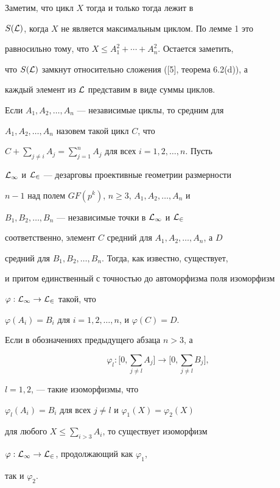 \begin{pf}


Заметим, что цикл $X$ тогда и только тогда лежит в


$S(\cal L)$, когда $X$ не является максимальным циклом. По лемме 1 это


равносильно тому, что $X \leq A_1^2 +\dotsb+A_n^2$. Остается заметить,


что $S(\cal L)$ замкнут относительно сложения ([5], теорема 6.2(d)), а


каждый элемент из $\cal L$ представим в виде суммы циклов.


\end{pf}





Если $A_1,A_2,\dotsc,A_n$ --- независимые циклы, то средним для


$A_1,A_2,\dotsc,A_n$ назовем такой цикл $C$, что


$C+\sum\limits_{j \ne i}A_j


=\sum \limits_{j=1}^n A_j$ для всех $i=1,2,\dotsc,n$. Пусть


$\cal L_1$ и $\cal L_2$ --- дезарговы проективные геометрии размерности


$n-1$ над полем $GF(p^k)$, $n \geq 3$, $A_1,A_2,\dotsc,A_n$ и


$B_1,B_2,\dotsc,B_n$ --- независимые точки в $\cal L_1$ и $\cal L_2$


соответственно, элемент $C$ средний для $A_1,A_2,\dotsc,A_n$, а $D$


средний для $B_1,B_2,\dotsc,B_n$. Тогда, как известно, существует,


и притом единственный с точностью до автоморфизма поля изоморфизм


$\varphi :\cal L_1\to \cal L_2$ такой, что


$\varphi(A_i)=B_i$ для $i=1,2,\dotsc,n$, и $\varphi(C)=D$.





\begin{lem}


Если в обозначениях предыдущего абзаца $n>3$, а


$$


\varphi_l:\Big[0,\sum \limits_{j \ne l}A_j\Big]


\to \Big[0,\sum \limits_{j \ne l}B_j\Big],


$$


$l=1,2$, --- такие изоморфизмы, что


$\varphi_l(A_i)=B_i$ для всех $j\ne l$ и $\varphi_1(X)=\varphi_2(X)$


для лю\-бо\-го $X \leq \sum \limits_{i>3}A_i$, то существует изоморфизм


{$\varphi:\cal L_1 \to \cal L_2$,} продолжающий как $\varphi_1$,


так и $\varphi_2$.


\end{lem}





